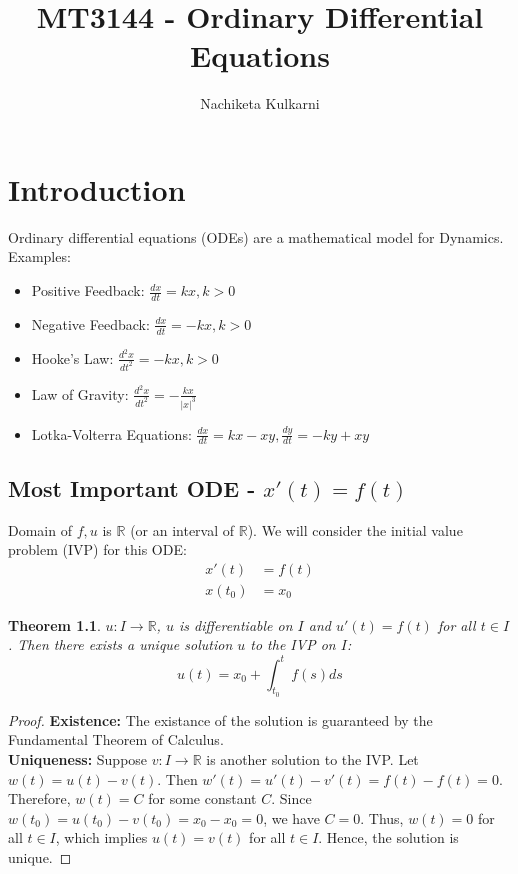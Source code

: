 \documentclass[12pt, oneside]{book}
\date{}
\title{MT3144 - Ordinary Differential Equations}
\author{Nachiketa Kulkarni}
\newtheorem{theorem}{Theorem}[chapter]
\begin{document}
\maketitle
\tableofcontents

\mainmatter
{}
\chapter{Introduction}
Ordinary differential equations (ODEs) are a mathematical model for Dynamics.
Examples:
\begin{itemize}
	\item Positive Feedback: \(\frac{dx}{dt} = kx, k > 0\)
	\item Negative Feedback: \(\frac{dx}{dt} = -kx, k > 0\)
	\item Hooke's Law: \(\frac{d^2x}{dt^2} = -kx, k > 0\)
	\item Law of Gravity: \(\frac{d^2x}{dt^2} = -\frac{kx}{|x|^3}\)
	\item Lotka-Volterra Equations: \(\frac{dx}{dt} = kx - xy, \frac{dy}{dt} = -ky + xy\)
\end{itemize}
\section{Most Important ODE - \(x'(t) = f(t)\)}
Domain of \(f, u\) is \(\mathbb{R}\) (or an interval of \(\mathbb{R}\)).
We will consider the initial value problem (IVP) for this ODE:
\begin{align*}
	x'(t) &= f(t) \\
	x(t_0) &= x_0
\end{align*}
\begin{theorem}
	\(u: I \rightarrow \mathbb{R}\), \(u\) is differentiable on \(I\) and \(u'(t) = f(t)\) for all \(t \in I\).
	Then there exists a unique solution \(u\) to the IVP on \(I\):
	\begin{equation}
		u(t) = x_0 + \int_{t_0}^{t} f(s) ds
	\end{equation}
\end{theorem}
\begin{proof}
	\textbf{Existence:} The existance of the solution is guaranteed by the Fundamental Theorem of Calculus.\\
	\textbf{Uniqueness:} Suppose \(v: I \rightarrow \mathbb{R}\) is another solution to the IVP.
	Let \(w(t) = u(t) - v(t)\).
	Then \(w'(t) = u'(t) - v'(t) = f(t) - f(t) = 0\).
	Therefore, \(w(t) = C\) for some constant \(C\).
	Since \(w(t_0) = u(t_0) - v(t_0) = x_0 - x_0 = 0\), we have \(C = 0\).
	Thus, \(w(t) = 0\) for all \(t \in I\), which implies \(u(t) = v(t)\) for all \(t \in I\).
	Hence, the solution is unique.
\end{proof}
\end{document}

